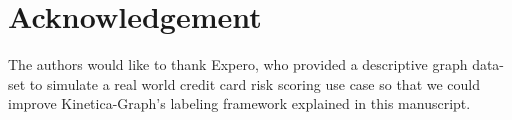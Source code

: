 \documentclass[preprint,3p,twocolumn]{elsarticle}
\def\CircleArrow{\hbox{$\circ$}\kern-1.5pt\hbox{$\rightarrow$}}
\begin{document}









\section*{Acknowledgement}

The authors would like to thank Expero, who provided a descriptive graph data-set to simulate a real world credit card risk scoring use case so that we could improve Kinetica-Graph's labeling framework explained in this manuscript.
\end{document}
